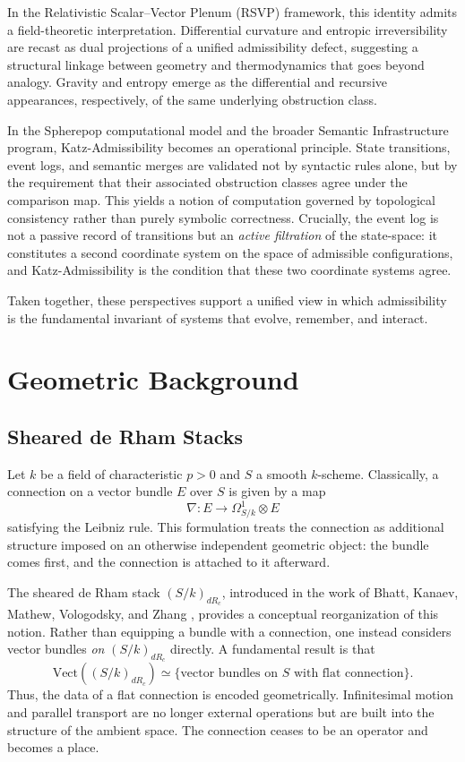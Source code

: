 \documentclass[12pt]{article}
\begin{document}
In the Relativistic Scalar--Vector Plenum (RSVP) framework, this identity admits a
field-theoretic interpretation. Differential curvature and entropic irreversibility
are recast as dual projections of a unified admissibility defect, suggesting a
structural linkage between geometry and thermodynamics that goes beyond analogy.
Gravity and entropy emerge as the differential and recursive appearances, respectively,
of the same underlying obstruction class.

In the Spherepop computational model and the broader Semantic Infrastructure program,
Katz-Admissibility becomes an operational principle. State transitions, event logs,
and semantic merges are validated not by syntactic rules alone, but by the requirement
that their associated obstruction classes agree under the comparison map. This yields a
notion of computation governed by topological consistency rather than purely symbolic
correctness. Crucially, the event log is not a passive record of transitions but an
\emph{active filtration} of the state-space: it constitutes a second coordinate system
on the space of admissible configurations, and Katz-Admissibility is the condition
that these two coordinate systems agree.

Taken together, these perspectives support a unified view in which admissibility is
the fundamental invariant of systems that evolve, remember, and interact.

\section{Geometric Background}

\subsection{Sheared de Rham Stacks}

Let $k$ be a field of characteristic $p > 0$ and $S$ a smooth $k$-scheme.
Classically, a connection on a vector bundle $E$ over $S$ is given by a map
\[
\nabla : E \to \Omega^1_{S/k} \otimes E
\]
satisfying the Leibniz rule. This formulation treats the connection as additional
structure imposed on an otherwise independent geometric object: the bundle comes first,
and the connection is attached to it afterward.

The sheared de Rham stack $(S/k)_{dR_c}$, introduced in the work of Bhatt, Kanaev,
Mathew, Vologodsky, and Zhang \cite{bhattkanaev}, provides a conceptual reorganization
of this notion. Rather than equipping a bundle with a connection, one instead considers
vector bundles \emph{on} $(S/k)_{dR_c}$ directly. A fundamental result is that
\[
\mathrm{Vect}((S/k)_{dR_c}) \simeq \{ \text{vector bundles on $S$ with flat connection} \}.
\]
Thus, the data of a flat connection is encoded geometrically. Infinitesimal motion and
parallel transport are no longer external operations but are built into the structure of
the ambient space. The connection ceases to be an operator and becomes a place.
\end{document}
